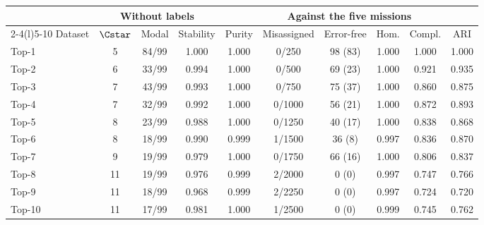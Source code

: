 \begin{tabular*}{\linewidth}{@{\extracolsep{\fill}}l@{\hspace{0.6em}}ccc@{\hspace{0.9em}}cccccc@{}}
\toprule
 & \multicolumn{3}{c}{Without labels} & \multicolumn{6}{c}{Against the five missions}\\
\cmidrule(lr){2-4}\cmidrule(l){5-10}
Dataset & $\Cstar$ & Modal & Stability & Purity & Misassigned & Error-free & Hom. & Compl. & ARI\\
\midrule
Top-1 & 5 & 84/99 & 1.000 & 1.000 & 0/250 & 98 (83) & 1.000 & 1.000 & 1.000\\
Top-2 & 6 & 33/99 & 0.994 & 1.000 & 0/500 & 69 (23) & 1.000 & 0.921 & 0.935\\
Top-3 & 7 & 43/99 & 0.993 & 1.000 & 0/750 & 75 (37) & 1.000 & 0.860 & 0.875\\
Top-4 & 7 & 32/99 & 0.992 & 1.000 & 0/1000 & 56 (21) & 1.000 & 0.872 & 0.893\\
Top-5 & 8 & 23/99 & 0.988 & 1.000 & 0/1250 & 40 (17) & 1.000 & 0.838 & 0.868\\
Top-6 & 8 & 18/99 & 0.990 & 0.999 & 1/1500 & 36 (8) & 0.997 & 0.836 & 0.870\\
Top-7 & 9 & 19/99 & 0.979 & 1.000 & 0/1750 & 66 (16) & 1.000 & 0.806 & 0.837\\
Top-8 & 11 & 19/99 & 0.976 & 0.999 & 2/2000 & 0 (0) & 0.997 & 0.747 & 0.766\\
Top-9 & 11 & 18/99 & 0.968 & 0.999 & 2/2250 & 0 (0) & 0.997 & 0.724 & 0.720\\
Top-10 & 11 & 17/99 & 0.981 & 1.000 & 1/2500 & 0 (0) & 0.999 & 0.745 & 0.762\\
\bottomrule
\end{tabular*}
